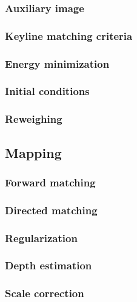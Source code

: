 \subsubsection{Auxiliary image}

\subsubsection{Keyline matching criteria}


\subsubsection{Energy minimization}

\subsubsection{Initial conditions}

\subsubsection{Reweighing}


\subsection{Mapping}

\subsubsection{Forward matching}

\subsubsection{Directed matching}

\subsubsection{Regularization}

\subsubsection{Depth estimation}

\subsubsection{Scale correction}



